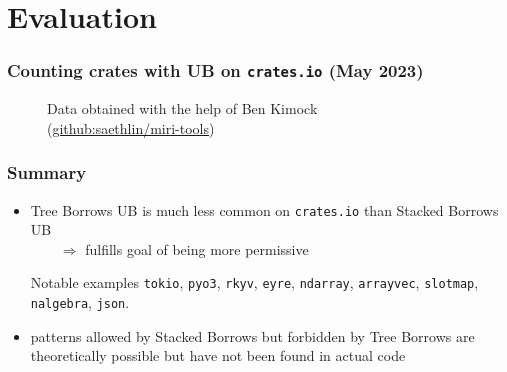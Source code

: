 \section{Evaluation}

\begin{frame}
    \frametitle{Counting crates with UB on \texttt{crates.io} (May 2023)}
    \begin{figure}
        {\footnotesize Data obtained with the help of Ben Kimock \\
        (\href{https://github.com/saethlin/miri-tools}{github:saethlin/miri-tools})}
    \end{figure}
\end{frame}

\begin{frame}
    \frametitle{Summary}
    \begin{itemize}
        \item Tree Borrows UB is much less common on \texttt{crates.io} than Stacked Borrows UB\\
            \(\qquad\Rightarrow\) fulfills goal of being more permissive
            \begin{block}{Notable examples}
                \texttt{tokio}, \texttt{pyo3}, \texttt{rkyv}, \texttt{eyre}, \texttt{ndarray},
                \texttt{arrayvec}, \texttt{slotmap}, \texttt{nalgebra}, \texttt{json}.
            \end{block}
        \item patterns allowed by Stacked Borrows but forbidden by Tree Borrows are theoretically
            possible but have not been found in actual code
    \end{itemize}
\end{frame}

